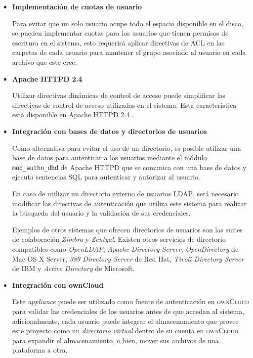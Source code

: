 \begin{itemize}
  \item \textbf{Implementaci\'{o}n de cuotas de usuario}

Para evitar que un solo usuario ocupe todo el espacio disponible en el disco, se pueden implementar cuotas para los usuarios que tienen permisos de escritura en el sistema, esto requerir\'{a} aplicar directivas de \textsc{ACL} en las carpetas de cada usuario para mantener el grupo asociado al usuario en cada archivo que este cree. 

  \item \textbf{Apache HTTPD 2.4}

Utilizar directivas din\'{a}micas de control de acceso puede simplificar las directivas de control de acceso utilizadas en el sistema. Esta caracter\'{i}stica est\'{a} disponible en Apache \textsc{HTTPD} 2.4 \cite{_mod_authz_core_????} \cite{_mod_authnz_ldap_????}.

  \item \textbf{Integraci\'{o}n con bases de datos y directorios de usuarios}


Como alternativa para evitar el uso de un directorio, es posible utilizar una base de datos para autenticar a los usuarios mediante el m\'{o}dulo \texttt{mod\_authn\_dbd} de Apache \textsc{HTTPD} que se comunica con una base de datos y ejecuta sentencias \textsc{SQL} para autenticar y autorizar al usuario.

En caso de utilizar un directorio externo de usuarios \textsc{LDAP}, ser\'{a} necesario modificar las directivas de autenticaci\'{o}n que utiliza este sistema para realizar la b\'{u}squeda del usuario y la validaci\'{o}n de sus credenciales.

Ejemplos de otros sistemas que ofrecen directorios de usuarios son las suites de colaboraci\'{o}n \textsl{Zimbra} y \textsl{Zentyal}.  Existen otros servicios de directorio compatibles como \textit{OpenLDAP}, \textit{Apache Directory Server}, \textit{OpenDirectory} de Mac OS X Server, \textit{389 Directory Server} de Red Hat, \textit{Tivoli Directory Server} de IBM y \textit{Active Directory} de Microsoft.

  \item \textbf{Integraci\'{o}n con ownCloud}

Este \textsl{appliance} puede ser utilizado como fuente de autenticaci\'{o}n en \textsc{ownCloud} para validar las credenciales de los usuarios antes de que accedan al sistema, adicionalmente, cada usuario puede integrar el almacenamiento que provee este proyecto como un \textsl{directorio virtual} dentro de su cuenta en \textsc{ownCloud} para expandir el almacenamiento, o bien, mover sus archivos de una plataforma a otra.

\end{itemize}

